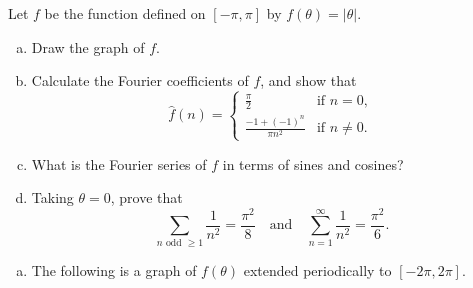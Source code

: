 \begin{exrc}[6]
    Let \(f\) be the function defined on \([-\pi, \pi]\) by \(f(\theta) = |\theta|\).
    \begin{enumerate}[(a)]
    \item
        Draw the graph of \(f\).
    \item
        Calculate the Fourier coefficients of \(f\), and show that
        \begin{equation*}
            \hat{f}(n) = 
            \begin{cases}
                \frac{\pi}{2} & \text{if \(n = 0\)},\\
                \frac{-1 + (-1)^n}{\pi n^2} & \text{if \(n \neq 0\)}.
            \end{cases}
        \end{equation*}
    \item
        What is the Fourier series of \(f\) in terms of sines and cosines?
    \item
        Taking \(\theta = 0\), prove that
        \begin{equation*}
            \sum_{n \text{ odd } \geq 1}^{} \frac{1}{n^2} = \frac{\pi^2}{8}
            \quad \text{and} \quad
            \sum_{n = 1}^{\infty} \frac{1}{n^2}= \frac{\pi^2}{6}.
        \end{equation*}
    \end{enumerate}

\begin{soln}
    \begin{enumerate}[(a)]
    \item
        The following is a graph of \(f(\theta)\) extended periodically to \([-2\pi, 2\pi]\).

\end{enumerate}
\end{soln}
\end{exrc}
